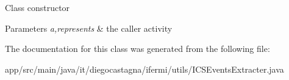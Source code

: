 Class constructor 
\begin{DoxyParams}{Parameters}
{\em a,represents} & the caller activity \\
\hline
\end{DoxyParams}


The documentation for this class was generated from the following file\+:\begin{DoxyCompactItemize}
\item 
app/src/main/java/it/diegocastagna/ifermi/utils/I\+C\+S\+Events\+Extracter.\+java\end{DoxyCompactItemize}
